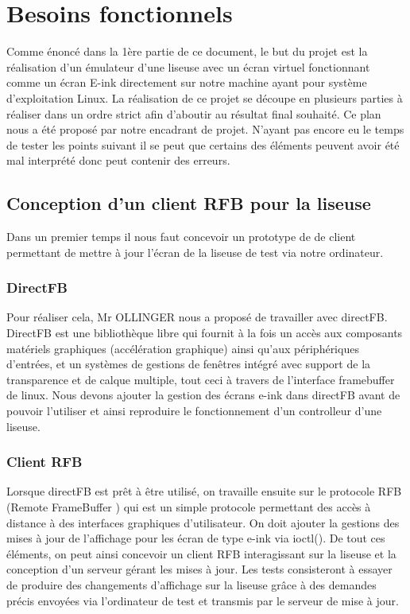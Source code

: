 \chapter{Besoins fonctionnels}

Comme énoncé dans la 1ère partie de ce document, le but du projet est la réalisation d'un émulateur d'une liseuse avec un écran virtuel fonctionnant comme un écran E-ink directement sur notre machine ayant pour système d'exploitation Linux. La réalisation de ce projet se découpe en plusieurs parties à réaliser dans un ordre strict afin d'aboutir au résultat final souhaité. Ce plan nous a été proposé par notre encadrant de projet. N'ayant pas encore eu le temps de tester les points suivant il se peut que certains des éléments peuvent avoir été mal interprété donc peut contenir des erreurs.

\section{Conception d'un client RFB pour la liseuse}

Dans un premier temps il nous faut concevoir un prototype de de client permettant de mettre à jour l'écran de la liseuse de test via notre ordinateur.

\subsection{DirectFB}
Pour réaliser cela, Mr OLLINGER nous a proposé de travailler avec directFB. DirectFB est une bibliothèque libre qui fournit à la fois un accès aux composants matériels graphiques (accélération graphique) ainsi qu'aux périphériques d'entrées, et un systèmes de gestions de fenêtres intégré avec support de la transparence et de calque multiple, tout ceci à travers de l'interface framebuffer de linux. Nous devons ajouter la gestion des écrans e-ink dans directFB avant de pouvoir l'utiliser et ainsi reproduire le fonctionnement d'un controlleur d'une liseuse. 
 
\subsection{Client RFB}
Lorsque directFB est prêt à être utilisé, on travaille ensuite sur le protocole RFB (Remote FrameBuffer ) qui est un simple protocole permettant des accès à distance à des interfaces graphiques d'utilisateur. On doit ajouter la gestions des mises à jour de l'affichage pour les écran de type e-ink via ioctl(). De tout ces éléments, on peut ainsi concevoir un client RFB interagissant sur la liseuse et la conception d'un serveur gérant les mises à jour.
Les tests consisteront à essayer de produire des changements d'affichage sur la liseuse grâce à des demandes précis envoyées via l'ordinateur de test et transmis par le serveur de mise à jour. 


